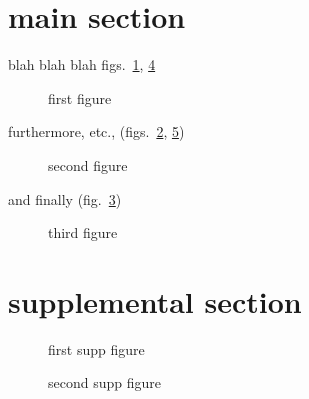 \section*{main section}\label{main-section}

blah blah blah figs.~\ref{fig:fig1}, \ref{fig:fig_s1}

\begin{figure}
\centering
{}
\caption{first figure}\label{fig:fig1}
\end{figure}

furthermore, etc., (figs.~\ref{fig:fig2}, \ref{fig:fig_s2})

\begin{figure}
\centering
{}
\caption{second figure}\label{fig:fig2}
\end{figure}

and finally (fig.~\ref{fig:fig3})

\begin{figure}
\centering
{}
\caption{third figure}\label{fig:fig3}
\end{figure}

\section{supplemental section}\label{supplemental-section}

\begin{figure}
\centering
{}
\caption{first supp figure}\label{fig:fig_s1}
\end{figure}

\begin{figure}
\centering
{}
\caption{second supp figure}\label{fig:fig_s2}
\end{figure}

\listoffigures

